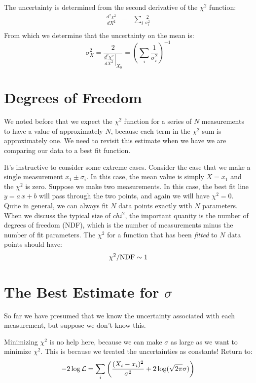 \documentclass[12pt,oneside]{book}
\begin{document}
The uncertainty is determined from the second derivative of the $\chi^2$ function:
\begin{eqnarray*}
\frac{d^2\chi^2}{dX^2} &=& \sum_i \frac{2}{\sigma_i^2}\\
\end{eqnarray*}
From which we determine that the uncertainty on the mean is:
\begin{displaymath}
\sigma^2_X = \frac{2}{\left. \frac{d^2\chi^2}{dX^2} \right|_{X_0}} = \left( \sum_i \frac{1}{\sigma_i^2} \right)^{-1}
\end{displaymath}


\section{Degrees of Freedom}

We noted before that we expect the $\chi^2$ function for a series of $N$ measurements to have a value of approximately $N$, because each term in the $\chi^2$ sum is approximately one.  We need to revisit this estimate when we have we are comparing our data to a best fit function.

It's instructive to consider some extreme cases.  Consider the case that we make a single measurement $x_1 \pm \sigma_i$.  In this case, the mean value is simply $X = x_1$ and the $\chi^2$ is zero.
Suppose we make two measurements.  In this case, the best fit line $y = a\,x + b$ will pass through the two points, and again we will have $\chi^2=0$.  Quite in general, we can always fit $N$ data points exactly with $N$ parameters.  When we discuss the typical size of $chi^2$, the important quanity is the number of degrees of freedom (NDF), which is the number of measurements minus the number of fit parameters.  The $\chi^2$ for a function that has been {\em fitted} to $N$ data points should have:
\begin{displaymath}
\chi^2 / {\rm NDF}  \sim 1
\end{displaymath}

\section{The Best Estimate for $\sigma$}

So far we have presumed that we know the uncertainty associated with each measurement, but suppose we don't know this.

Minimizing $\chi^2$ is no help here, because we can make $\sigma$ as large as we want to minimize $\chi^2$.  This is because we treated the uncertainties as constants!  Return to:
\begin{equation}
-2 \log {\cal L} = \sum_i \left( \frac{(X_i-x_i)^2}{\sigma^2} + 2 \log(\sqrt{2\pi}\sigma)\right)
\end{equation}
\end{document}
